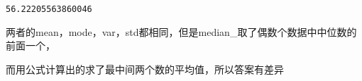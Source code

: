 \documentclass[11pt]{article}
\makeatletter
\newcommand{\boxspacing}{\kern\kvtcb@left@rule\kern\kvtcb@boxsep}
\newcommand{\prompt}[4]{
        \ttfamily\llap{{\color{#2}[#3]:\hspace{3pt}#4}}\vspace{-\baselineskip}
    }
\makeatother
\begin{document}
            \begin{tcolorbox}[breakable, size=fbox, boxrule=.5pt, pad at break*=1mm, opacityfill=0]
\prompt{Out}{outcolor}{122}{\boxspacing}
\begin{Verbatim}[commandchars=\\\{\}]
56.22205563860046
\end{Verbatim}
\end{tcolorbox}
        
    两者的mean，mode，var，std都相同，但是median\_取了偶数个数据中中位数的前面一个，
    
    而用公式计算出的求了最中间两个数的平均值，所以答案有差异


    
    
    
\end{document}
